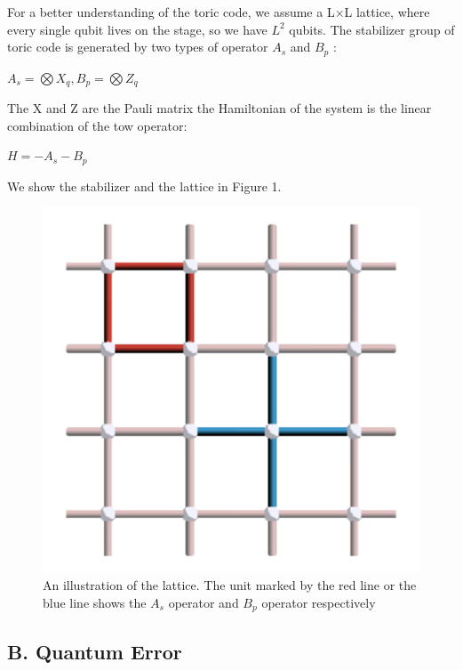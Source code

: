 \documentclass[
    a4paper, %
    10pt, %
    unnumberedsections, %
    twoside, %
]{LTJournalArticle}
\begin{document}
For a better understanding of the toric code, we assume a L$\times$L lattice, where every single qubit lives on the stage, so we have $L^2$ qubits. The stabilizer group of toric code is generated by two types of operator $A_s$ and $B_p$ \cite{8}:
\begin{center}
$A_s = \bigotimes X_q,B_p = \bigotimes Z_q$
\end{center}
The X and Z are the Pauli matrix the Hamiltonian of the system is the linear combination of the tow operator:
\begin{center}
$H = -A_s-B_p$
\end{center}
We show the stabilizer and the lattice in Figure 1.
\begin{figure} %
    \setlength{\abovecaptionskip}{0.cm} %
    \setlength{\abovecaptionskip}{0.cm} 
    \includegraphics[width=\linewidth]{img/figure 1.png}
    \caption{An illustration of the lattice. The unit marked by the red line or the blue line shows the $A_s$ operator and $B_p$ operator respectively}
    \label{fig:tcanther}
\end{figure}

\subsection{B. Quantum Error}
\end{document}
